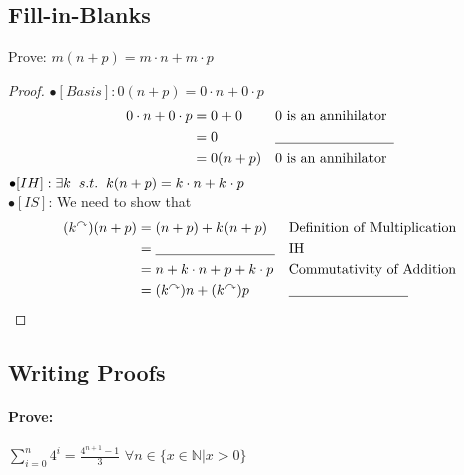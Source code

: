 \documentclass[12pt]{article}
\begin{document}
\subsection{Fill-in-Blanks}
Prove: $m(n+p)=m\cdot n + m\cdot p$
\begin{proof}
$\bullet [Basis]: 0(n+p)=0\cdot n +0\cdot p  $
\begin{align*}
0\cdot n +0\cdot p&=0+0&&\text{$0$ is an annihilator}\\
&=0&&\text{\underline{\hspace{3cm}}}\\
&=0(n+p)&&\text{$0$ is an annihilator}\\
\end{align*}
$\bullet[IH]: \exists{k} \text{\hspace{0.2cm}}s.t.\text{\hspace{0.2cm}} k(n+p)=k\cdot n+k\cdot p$\\
$\bullet[IS]$: We need to show that \underline{\hspace{3cm}}
\begin{align*}
(k^\curvearrowright)(n+p)&=(n+p)+k(n+p) &&\text{Definition of Multiplication}\\
&=\text{\underline{\hspace{3cm}}}&&\text{IH}\\
&=n+k\cdot n+p+k\cdot p &&\text{Commutativity of Addition}\\
&=(k^\curvearrowright)n+(k^\curvearrowright)p &&\text{\underline{\hspace{3cm}}}
\end{align*}
\end{proof}
\subsection{Writing Proofs}
\paragraph{Prove:}$\sum_{i=0}^n 4^i=\frac{4^{n+1}-1}{3}$ \hspace{3cm} $ \forall n\in\{x\in\mathbb{N}|x>0\}$
\end{document}
